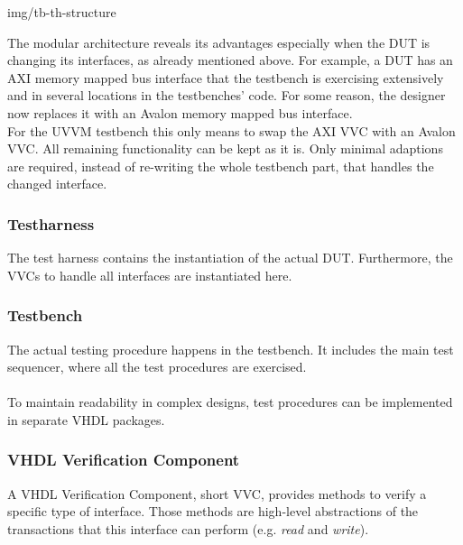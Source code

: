  {img/tb-th-structure}

The modular architecture reveals its advantages especially when the DUT is changing its interfaces, as already mentioned above. For example, a DUT has an AXI memory mapped bus interface that the testbench is exercising extensively and in several locations in the testbenches' code. For some reason, the designer now replaces it with an Avalon memory mapped bus interface. \\
For the UVVM testbench this only means to swap the AXI VVC with an Avalon VVC. All remaining functionality can be kept as it is. Only minimal adaptions are required, instead of re-writing the whole testbench part, that handles the changed interface.


\subsubsection{Testharness}

The test harness contains the instantiation of the actual DUT. Furthermore, the VVCs to handle all interfaces are instantiated here.

\subsubsection{Testbench}

The actual testing procedure happens in the testbench. It includes the main test sequencer, where all the test procedures are exercised.\\
\\
To maintain readability in complex designs, test procedures can be implemented in separate VHDL packages.

\subsubsection{VHDL Verification Component}

A VHDL Verification Component, short VVC, provides methods to verify a specific type of interface. Those methods are high-level abstractions of the transactions that this interface can perform (e.g. \textit{read} and \textit{write}).



